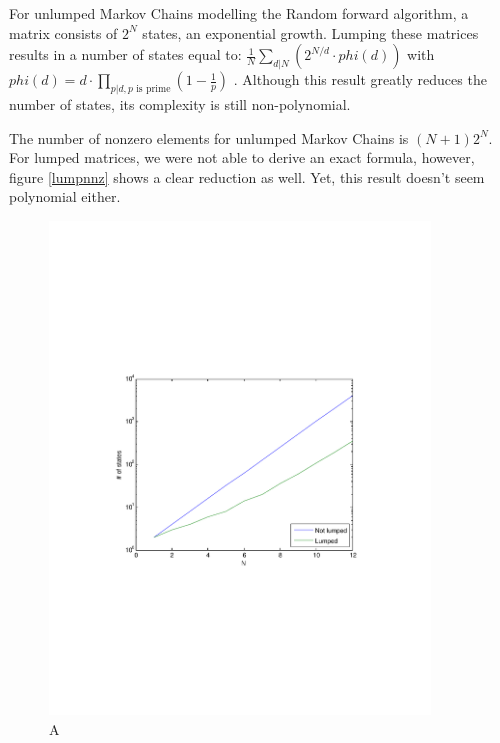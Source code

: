 \documentclass[10pt,a4paper]{article}
\begin{document}
For unlumped Markov Chains modelling the Random forward algorithm, a matrix consists of $2^N$ states, an exponential growth. Lumping these matrices results in a number of states equal to:  $\frac{1}{N} \sum_{d|N} (2^{N/d} \cdot phi(d) )$ with $phi(d) = d \cdot \prod_{p|d, p\text{ is prime}} (1-\frac{1}{p})$ \cite{A000031}. Although this result greatly reduces the number of states, its complexity is still non-polynomial.

The number of nonzero elements for unlumped Markov Chains is $(N+1) 2^N$. For lumped matrices, we were not able to derive an exact formula, however, figure \ref{lumpnnz} shows a clear reduction as well. Yet, this result doesn't seem polynomial either.

\begin{figure}[h!tb]
\centering
\includegraphics[clip=true, trim=9em 24em 9em 24em, width=0.9\textwidth]{resources/plotlumping.pdf}
\caption{A}
\label{lump}
\end{figure}
\end{document}
